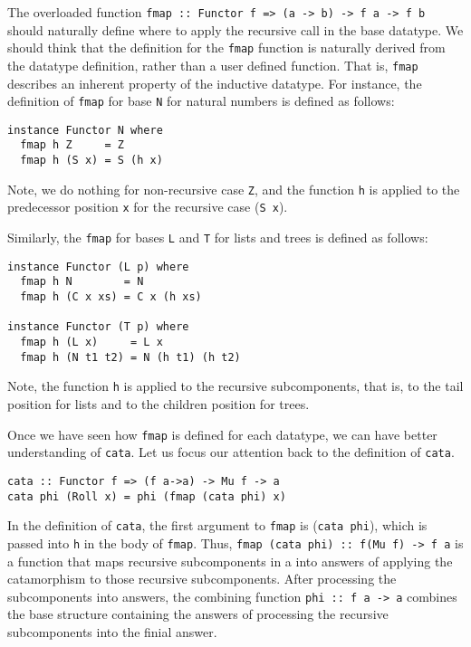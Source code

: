 The overloaded function \texttt{fmap :: Functor f => (a -> b) -> f a -> f b}
should naturally define where to apply the recursive call in the base datatype.
We should think that the definition for the \texttt{fmap} function is
naturally derived from the datatype definition, rather than a user defined
function. That is, \texttt{fmap} describes an inherent property of the
inductive datatype. For instance, the definition of \texttt{fmap} for base
\texttt{N} for natural numbers is defined as follows:
\begin{verbatim}
instance Functor N where
  fmap h Z     = Z
  fmap h (S x) = S (h x)
\end{verbatim}
Note, we do nothing for non-recursive case \texttt{Z}, and 
the function \texttt{h} is applied to the predecessor position \texttt{x}
for the recursive case (\texttt{S x}).

Similarly, the \texttt{fmap} for bases \texttt{L} and \texttt{T}
for lists and trees is defined as follows:
\begin{verbatim}
instance Functor (L p) where
  fmap h N        = N
  fmap h (C x xs) = C x (h xs)

instance Functor (T p) where
  fmap h (L x)     = L x
  fmap h (N t1 t2) = N (h t1) (h t2)
\end{verbatim}
Note, the function \texttt{h} is applied to the recursive subcomponents,
that is, to the tail position for lists and to the children position for trees.

Once we have seen how \texttt{fmap} is defined for each datatype,
we can have better understanding of \texttt{cata}.
Let us focus our attention back to the definition of \texttt{cata}.
\begin{verbatim}
cata :: Functor f => (f a->a) -> Mu f -> a 
cata phi (Roll x) = phi (fmap (cata phi) x)
\end{verbatim}
In the definition of \texttt{cata}, the first argument to \texttt{fmap}
is (\texttt{cata phi}), which is passed into \texttt{h} in the body of
\texttt{fmap}. Thus, \texttt{fmap (cata phi) :: f(Mu f) -> f a} is a function
that maps recursive subcomponents in a into answers of applying
the catamorphism to those recursive subcomponents. After processing
the subcomponents into answers, the combining function
\texttt{phi :: f a -> a} combines the base structure containing
the answers of processing the recursive subcomponents into the finial answer.


